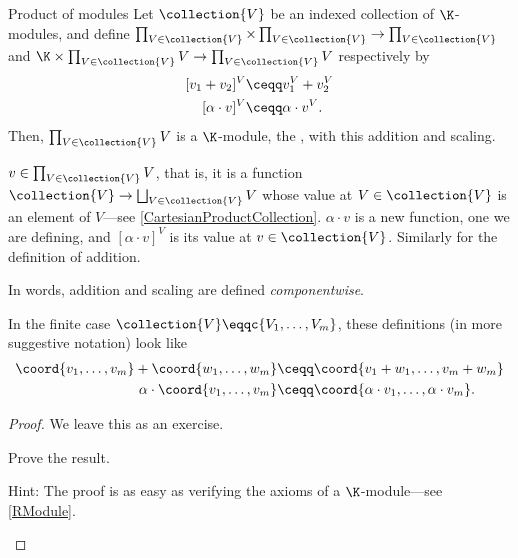 \begin{prp}{Product of modules}{}
	Let $\collection{V}$ be an indexed collection of $\K$-modules, and define $\prod _{V\in \collection{V}}\times \prod _{V\in \collection{V}}\rightarrow \prod _{V\in \collection{V}}$ and $\K \times \prod _{V\in \collection{V}}V\rightarrow \prod _{V\in \collection{V}}V$ respectively by
	\begin{subequations}
		\begin{align}
			[v_1+v_2]^V & \ceqq v_1^V+v_2^V \\
			[\alpha \cdot v]^V & \ceqq \alpha \cdot v^V.
		\end{align}
	\end{subequations}
	Then, $\prod _{V\in \collection{V}}V$ is a $\K$-module, the , with this addition and scaling.
	\begin{rmk}
		$v\in \prod _{V\in \collection{V}}V$, that is, it is a function $\collection{V}\rightarrow \bigsqcup _{V\in \collection{V}}V$ whose value at $V\in \collection{V}$ is an element of $V$---see \cref{CartesianProductCollection}.  $\alpha \cdot v$ is a new function, one we are defining, and $[\alpha \cdot v]^V$ is its value at $v\in \collection{V}$.  Similarly for the definition of addition.
	\end{rmk}
	\begin{rmk}
		In words, addition and scaling are defined \emph{componentwise}.
	\end{rmk}
	\begin{rmk}
		In the finite case $\collection{V}\eqqc \{ V_1,\ldots ,V_m\}$, these definitions (in more suggestive notation) look like
		\begin{subequations}
			\begin{align}
				\coord{v_1,\ldots ,v_m}+\coord{w_1,\ldots ,w_m} & \ceqq \coord{v_1+w_1,\ldots ,v_m+w_m} \\
				\alpha \cdot \coord{v_1,\ldots ,v_m} & \ceqq \coord{\alpha \cdot v_1,\ldots ,\alpha \cdot v_m}.
			\end{align}
		\end{subequations}
	\end{rmk}
	\begin{proof}
		We leave this as an exercise.
		\begin{exr}[breakable=false]{}{}
			Prove the result.
			\begin{rmk}
				Hint:  The proof is as easy as verifying the axioms of a $\K$-module---see \cref{RModule}.
			\end{rmk}
		\end{exr}
	\end{proof} 
\end{prp}

